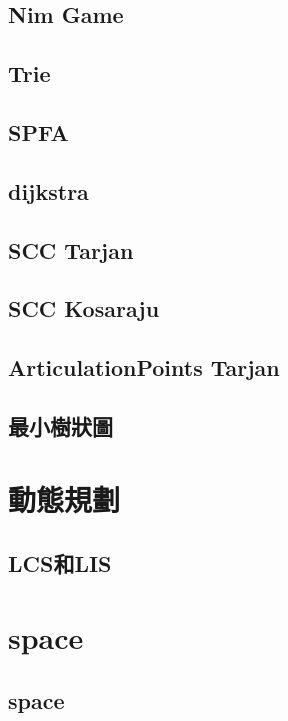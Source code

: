     \subsection{Nim Game}
        
    \subsection{Trie}
        
    \subsection{SPFA}
        
    \subsection{dijkstra}
        
    \subsection{SCC Tarjan}
        
    \subsection{SCC Kosaraju}
        
    \subsection{ArticulationPoints Tarjan}
        
    \subsection{最小樹狀圖}
        
        
\section{動態規劃}
    \subsection{LCS和LIS}
        


\section{space}
    \subsection{space}
        

